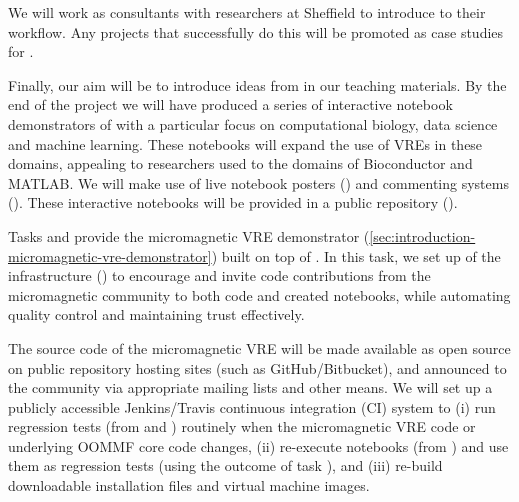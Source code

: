 \begin{workpackage}
\begin{tasklist}
\begin{task}[title=Introduce \TheProject to Researchers and Teachers, id=project-intro,lead=USH,wphases=6-44,PM=20,partners={USO}]
  We will work as consultants with researchers at Sheffield to
  introduce \TheProject to their workflow. Any projects that
  successfully do this will be promoted as case studies for
  \TheProject.

  Finally, our aim will be to introduce ideas from
   in our teaching materials. By the end of the
  project we will have produced a series of interactive notebook
  demonstrators  of \TheProject with a
  particular focus on computational biology, data science and machine
  learning. These notebooks will expand the use of VREs in these
  domains, appealing to researchers used to the domains of
  Bioconductor and MATLAB. We will make use of live notebook posters
  () and commenting systems
  (). These interactive notebooks
  will be provided in a public repository
  ().
\end{task}

\begin{task}[id=dissemination-of-oommf-nb-virtual-environment,
  title=Open source dissemination of micromagnetic VRE,
  lead=USO,PM=4,partners={SR,USH,PS},wphases=24-28]
  Tasks  and
   provide the
  micromagnetic VRE demonstrator
  (\ref{sec:introduction-micromagnetic-vre-demonstrator}) built on top
  of \TheProject.  In this task, we set up of the infrastructure
  () to encourage
  and invite code contributions from the micromagnetic community to
  both code and created notebooks, while automating quality control
  and maintaining trust effectively.

  The source code of the micromagnetic VRE will be made available as
  open source on public repository hosting sites (such as
  GitHub/Bitbucket), and announced to the community via appropriate
  mailing lists and other means. We will set up a publicly accessible
  Jenkins/Travis continuous integration (CI) system to (i) run
  regression tests (from
   and
  ) routinely when the
  micromagnetic VRE code or underlying OOMMF core code changes, (ii)
  re-execute notebooks (from
  ) and use them as
  regression tests (using the outcome of task
  ), and (iii) re-build
  downloadable installation files and virtual machine images.


\end{task}
\end{tasklist}
\end{workpackage}

